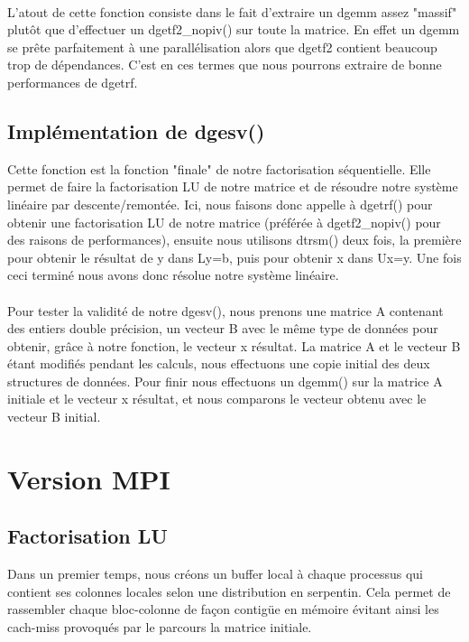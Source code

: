\documentclass{article}
\begin{document}
\paragraph{}L'atout de cette fonction consiste dans le fait d'extraire un dgemm assez "massif" plutôt que d'effectuer un dgetf2\_nopiv() sur toute la matrice. En effet un dgemm se prête parfaitement à une parallélisation alors que dgetf2 contient beaucoup trop de dépendances. C'est en ces termes que nous pourrons extraire de bonne performances de dgetrf.

\subsection{Implémentation de dgesv()}Cette fonction est la fonction "finale" de notre factorisation séquentielle. Elle permet de faire la factorisation LU de notre matrice et de résoudre notre système linéaire par descente/remontée. Ici, nous faisons donc appelle à dgetrf() pour obtenir une factorisation LU de notre matrice (préférée à dgetf2\_nopiv() pour des raisons de performances), ensuite nous utilisons dtrsm() deux fois, la première pour obtenir le résultat de y dans Ly=b, puis pour obtenir x dans Ux=y. Une fois ceci terminé nous avons donc résolue notre système linéaire.

\paragraph{}Pour tester la validité de notre dgesv(), nous prenons une matrice A contenant des entiers double précision, un vecteur B avec le même type de données pour obtenir, grâce à notre fonction, le vecteur x résultat. La matrice A et le vecteur B étant modifiés pendant les calculs, nous effectuons une copie initial des deux structures de données. Pour finir nous effectuons un dgemm() sur la matrice A initiale et le vecteur x résultat, et nous comparons le vecteur obtenu avec le vecteur B initial.

\section{Version MPI}
\subsection{Factorisation LU}
Dans un premier temps, nous créons un buffer local à chaque processus qui contient ses colonnes locales selon une distribution en serpentin. Cela permet de rassembler chaque bloc-colonne de façon contigüe en mémoire évitant ainsi les cach-miss provoqués par le parcours la matrice initiale.
\end{document}
